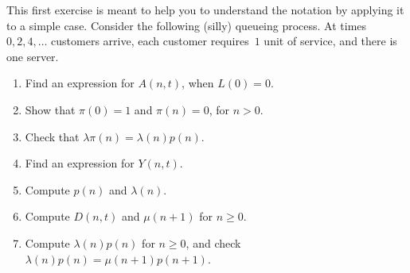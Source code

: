 \documentclass[queueing-book.tex]{subfiles}
\begin{document}
\begin{exercise} \label{ex:111} This first exercise is meant to help you to understand the notation by applying it to a simple case.
Consider the following (silly) queueing process.
At times $0, 2,4, \ldots$ customers arrive, each customer requires~$1$ unit of service, and there is one server.
 \begin{enumerate}
 \item  Find an expression for $A(n,t)$, when $L(0)=0$.
 \item Show that $\pi(0)=1$ and $\pi(n)=0$, for $n>0$.
 \item Check that $\lambda \pi(n) = \lambda(n) p(n)$.
 \item  Find an expression for $Y(n,t)$.
 \item Compute $p(n)$ and $\lambda(n)$.
 \item Compute $D(n,t)$ and $\mu(n+1)$ for $n\geq 0$.
 \item Compute $\lambda(n) p(n)$ for $n\geq 0$, and check $\lambda(n) p(n) = \mu(n+1) p(n+1)$.
 \end{enumerate}


\end{exercise}
\end{document}
